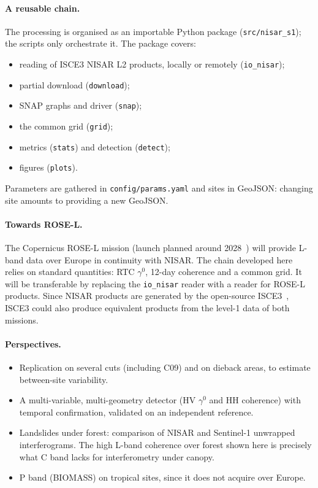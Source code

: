 \documentclass[11pt,a4paper]{article}
\begin{document}
\paragraph{A reusable chain.} The processing is organised as an importable Python package (\texttt{src/nisar\_s1});
the scripts only orchestrate it. The package covers:
\begin{itemize}
\item reading of ISCE3 NISAR L2 products, locally or remotely (\texttt{io\_nisar});
\item partial download (\texttt{download});
\item SNAP graphs and driver (\texttt{snap});
\item the common grid (\texttt{grid});
\item metrics (\texttt{stats}) and detection (\texttt{detect});
\item figures (\texttt{plots}).
\end{itemize}
Parameters are gathered in \texttt{config/params.yaml} and sites in GeoJSON: changing site amounts to providing a
new GeoJSON.

\paragraph{Towards ROSE-L.} The Copernicus ROSE-L mission (launch planned around 2028~\cite{esa2020rosel}) will provide
L-band data over Europe in continuity with NISAR. The chain developed here relies on standard quantities: RTC
$\gamma^0$, 12-day coherence and a common grid. It will be transferable by replacing the \texttt{io\_nisar} reader
with a reader for ROSE-L products. Since NISAR products are generated by the open-source ISCE3~\cite{isce3}, ISCE3
could also produce equivalent products from the level-1 data of both missions.

\paragraph{Perspectives.}
\begin{itemize}
\item Replication on several cuts (including C09) and on dieback areas, to estimate between-site variability.
\item A multi-variable, multi-geometry detector (HV $\gamma^0$ and HH coherence) with temporal confirmation,
  validated on an independent reference.
\item Landslides under forest: comparison of NISAR and Sentinel-1 unwrapped interferograms. The high L-band coherence
  over forest shown here is precisely what C band lacks for interferometry under canopy.
\item P band (BIOMASS) on tropical sites, since it does not acquire over Europe.
\end{itemize}
\end{document}
